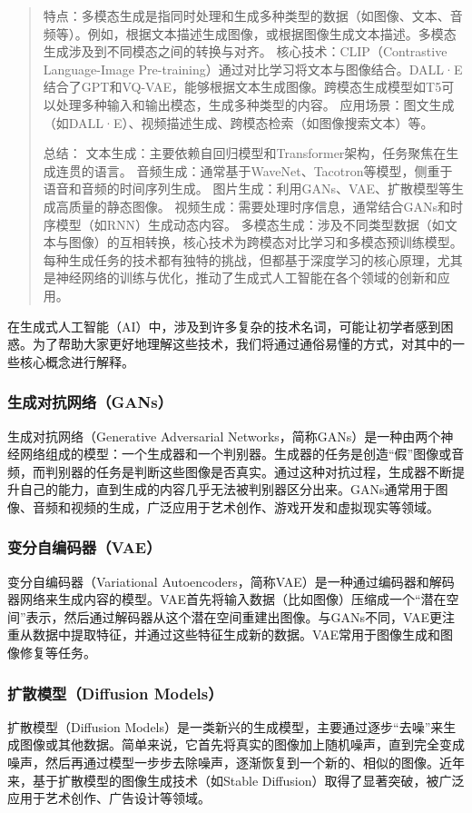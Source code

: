 \begin{quote}
特点：多模态生成是指同时处理和生成多种类型的数据（如图像、文本、音频等）。例如，根据文本描述生成图像，或根据图像生成文本描述。多模态生成涉及到不同模态之间的转换与对齐。  
核心技术：CLIP（Contrastive Language-Image Pre-training）通过对比学习将文本与图像结合。DALL·E结合了GPT和VQ-VAE，能够根据文本生成图像。跨模态生成模型如T5可以处理多种输入和输出模态，生成多种类型的内容。  
应用场景：图文生成（如DALL·E）、视频描述生成、跨模态检索（如图像搜索文本）等。

总结：  
文本生成：主要依赖自回归模型和Transformer架构，任务聚焦在生成连贯的语言。  
音频生成：通常基于WaveNet、Tacotron等模型，侧重于语音和音频的时间序列生成。  
图片生成：利用GANs、VAE、扩散模型等生成高质量的静态图像。  
视频生成：需要处理时序信息，通常结合GANs和时序模型（如RNN）生成动态内容。  
多模态生成：涉及不同类型数据（如文本与图像）的互相转换，核心技术为跨模态对比学习和多模态预训练模型。  
每种生成任务的技术都有独特的挑战，但都基于深度学习的核心原理，尤其是神经网络的训练与优化，推动了生成式人工智能在各个领域的创新和应用。
\end{quote}
在生成式人工智能（AI）中，涉及到许多复杂的技术名词，可能让初学者感到困惑。为了帮助大家更好地理解这些技术，我们将通过通俗易懂的方式，对其中的一些核心概念进行解释。

\subsubsection*{生成对抗网络（GANs）}
生成对抗网络（Generative Adversarial Networks，简称GANs）是一种由两个神经网络组成的模型：一个生成器和一个判别器。生成器的任务是创造“假”图像或音频，而判别器的任务是判断这些图像是否真实。通过这种对抗过程，生成器不断提升自己的能力，直到生成的内容几乎无法被判别器区分出来。GANs通常用于图像、音频和视频的生成，广泛应用于艺术创作、游戏开发和虚拟现实等领域。

\subsubsection*{变分自编码器（VAE）}
变分自编码器（Variational Autoencoders，简称VAE）是一种通过编码器和解码器网络来生成内容的模型。VAE首先将输入数据（比如图像）压缩成一个“潜在空间”表示，然后通过解码器从这个潜在空间重建出图像。与GANs不同，VAE更注重从数据中提取特征，并通过这些特征生成新的数据。VAE常用于图像生成和图像修复等任务。

\subsubsection*{扩散模型（Diffusion Models）}
扩散模型（Diffusion Models）是一类新兴的生成模型，主要通过逐步“去噪”来生成图像或其他数据。简单来说，它首先将真实的图像加上随机噪声，直到完全变成噪声，然后再通过模型一步步去除噪声，逐渐恢复到一个新的、相似的图像。近年来，基于扩散模型的图像生成技术（如Stable Diffusion）取得了显著突破，被广泛应用于艺术创作、广告设计等领域。

